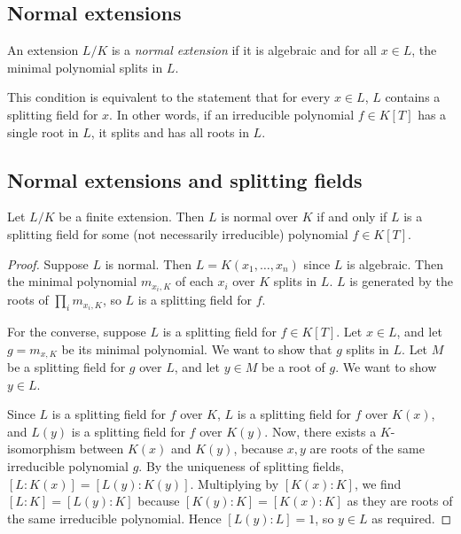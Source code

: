 \subsection{Normal extensions}
\begin{definition}
	An extension \( L / K \) is a \emph{normal extension} if it is algebraic and for all \( x \in L \), the minimal polynomial splits in \( L \).
\end{definition}
\begin{remark}
	This condition is equivalent to the statement that for every \( x \in L \), \( L \) contains a splitting field for \( x \).
	In other words, if an irreducible polynomial \( f \in K[T] \) has a single root in \( L \), it splits and has all roots in \( L \).
\end{remark}

\subsection{Normal extensions and splitting fields}
\begin{theorem}
	Let \( L / K \) be a finite extension.
	Then \( L \) is normal over \( K \) if and only if \( L \) is a splitting field for some (not necessarily irreducible) polynomial \( f \in K[T] \).
\end{theorem}
\begin{proof}
	Suppose \( L \) is normal.
	Then \( L = K(x_1, \dots, x_n) \) since \( L \) is algebraic.
	Then the minimal polynomial \( m_{x_i,K} \) of each \( x_i \) over \( K \) splits in \( L \).
	\( L \) is generated by the roots of \( \prod_i m_{x_i,K} \), so \( L \) is a splitting field for \( f \).

	For the converse, suppose \( L \) is a splitting field for \( f \in K[T] \).
	Let \( x \in L \), and let \( g = m_{x,K} \) be its minimal polynomial.
	We want to show that \( g \) splits in \( L \).
	Let \( M \) be a splitting field for \( g \) over \( L \), and let \( y \in M \) be a root of \( g \).
	We want to show \( y \in L \).
	
	Since \( L \) is a splitting field for \( f \) over \( K \), \( L \) is a splitting field for \( f \) over \( K(x) \), and \( L(y) \) is a splitting field for \( f \) over \( K(y) \).
	Now, there exists a \( K \)-isomorphism between \( K(x) \) and \( K(y) \), because \( x, y \) are roots of the same irreducible polynomial \( g \).
	By the uniqueness of splitting fields, \( [L:K(x)] = [L(y):K(y)] \).
	Multiplying by \( [K(x):K] \), we find \( [L:K] = [L(y):K] \) because \( [K(y):K] = [K(x):K] \) as they are roots of the same irreducible polynomial.
	Hence \( [L(y):L] = 1 \), so \( y \in L \) as required.
\end{proof}
